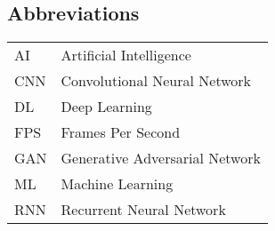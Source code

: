 \begin{center}
    \section*{Abbreviations}
    \begin{table}[h]
        \centering
        \begin{tabular}{ll}
            AI  & \hspace{2.3 in} Artificial Intelligence        \\
            CNN & \hspace{2.3 in} Convolutional Neural Network   \\
            DL  & \hspace{2.3 in} Deep Learning                  \\
            FPS & \hspace{2.3 in} Frames Per Second              \\
            GAN & \hspace{2.3 in} Generative Adversarial Network \\
            ML  & \hspace{2.3 in} Machine Learning               \\
            RNN & \hspace{2.3 in} Recurrent Neural Network       \\
        \end{tabular}
    \end{table}
\end{center}

